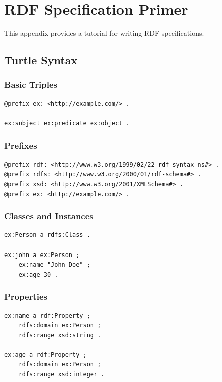 \chapter{RDF Specification Primer}

This appendix provides a tutorial for writing RDF specifications.

\section{Turtle Syntax}

\subsection{Basic Triples}

\begin{verbatim}
@prefix ex: <http://example.com/> .

ex:subject ex:predicate ex:object .
\end{verbatim}

\subsection{Prefixes}

\begin{verbatim}
@prefix rdf: <http://www.w3.org/1999/02/22-rdf-syntax-ns#> .
@prefix rdfs: <http://www.w3.org/2000/01/rdf-schema#> .
@prefix xsd: <http://www.w3.org/2001/XMLSchema#> .
@prefix ex: <http://example.com/> .
\end{verbatim}

\subsection{Classes and Instances}

\begin{verbatim}
ex:Person a rdfs:Class .

ex:john a ex:Person ;
    ex:name "John Doe" ;
    ex:age 30 .
\end{verbatim}

\subsection{Properties}

\begin{verbatim}
ex:name a rdf:Property ;
    rdfs:domain ex:Person ;
    rdfs:range xsd:string .

ex:age a rdf:Property ;
    rdfs:domain ex:Person ;
    rdfs:range xsd:integer .
\end{verbatim}

